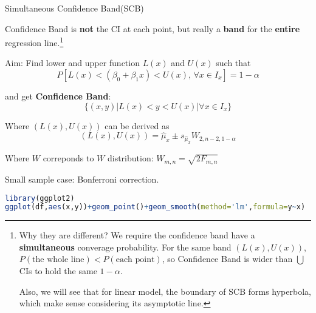     


    \begin{point}
       Simultaneous Confidence Band(SCB)
    \end{point}

    Confidence Band is \textbf{not} the CI at each point, but really a \textbf{band} for the \textbf{entire} regression line.\footnote{Why they are different? We require the confidence band have a \textbf{simultaneous} converage probability. For the same band $ (L(x),U(x)) $, $ P(\text{the whole line})< P(\text{each point})$, so Confidence Band is wider than $ \bigcup $CIs to hold the same $ 1-\alpha $.
    
    Also, we will see that for linear model, the boundary of SCB forms hyperbola, which make sense considering its asymptotic line.}
    
    
    Aim: Find lower and upper function $ L(x) $ and $ U(x) $ such that
    \begin{equation}
        P[L(x)<(\beta _0+\beta _1x)<U(x),\,\forall x\in I_x]=1-\alpha  
    \end{equation}
    
    and get \textbf{Confidence Band}:
    \begin{equation}
        \{(x,y)|L(x)<y<U(x)|\forall x\in I_x\} 
    \end{equation}
    

    Where $ (L(x),U(x)) $ can be derived as
    \begin{equation}
        (L(x),U(x))=\hat{\mu}_x\pm s_{\hat{\mu}_x}W_{2,n-2,1-\alpha}
    \end{equation}

    Where $ W $ correponds to $ W $ distribution: $ W_{m,n}=\sqrt{2F_{m,n}} $
    
    
    
    Small sample case: Bonferroni correction.
    
\begin{rcode}
\begin{lstlisting}[language=R]
library(ggplot2)
ggplot(df,aes(x,y))+geom_point()+geom_smooth(method='lm',formula=y~x)
\end{lstlisting}
\end{rcode}



